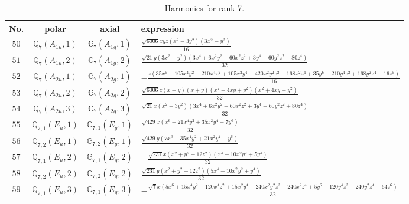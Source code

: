 \documentclass[fleqn,8pt,landscape]{jsarticle}
\begin{document}
\begin{table}[ht!]
\begin{center}
\caption{Harmonics for rank 7.}
\renewcommand{\arraystretch}{1.3}
\begin{tabular}{cccl} \hline \hline
No. & polar & axial & expression \\ \hline
$ 50 $ & $ \mathbb{Q}_{7}(A_{1u},1) $ & $ \mathbb{G}_{7}(A_{1g},1) $ & $ \frac{\sqrt{6006} x y z \left(x^{2} - 3 y^{2}\right) \left(3 x^{2} - y^{2}\right)}{16} $ \\
$ 51 $ & $ \mathbb{Q}_{7}(A_{1u},2) $ & $ \mathbb{G}_{7}(A_{1g},2) $ & $ \frac{\sqrt{21} y \left(3 x^{2} - y^{2}\right) \left(3 x^{4} + 6 x^{2} y^{2} - 60 x^{2} z^{2} + 3 y^{4} - 60 y^{2} z^{2} + 80 z^{4}\right)}{32} $ \\
$ 52 $ & $ \mathbb{Q}_{7}(A_{2u},1) $ & $ \mathbb{G}_{7}(A_{2g},1) $ & $ - \frac{z \left(35 x^{6} + 105 x^{4} y^{2} - 210 x^{4} z^{2} + 105 x^{2} y^{4} - 420 x^{2} y^{2} z^{2} + 168 x^{2} z^{4} + 35 y^{6} - 210 y^{4} z^{2} + 168 y^{2} z^{4} - 16 z^{6}\right)}{16} $ \\
$ 53 $ & $ \mathbb{Q}_{7}(A_{2u},2) $ & $ \mathbb{G}_{7}(A_{2g},2) $ & $ \frac{\sqrt{6006} z \left(x - y\right) \left(x + y\right) \left(x^{2} - 4 x y + y^{2}\right) \left(x^{2} + 4 x y + y^{2}\right)}{32} $ \\
$ 54 $ & $ \mathbb{Q}_{7}(A_{2u},3) $ & $ \mathbb{G}_{7}(A_{2g},3) $ & $ \frac{\sqrt{21} x \left(x^{2} - 3 y^{2}\right) \left(3 x^{4} + 6 x^{2} y^{2} - 60 x^{2} z^{2} + 3 y^{4} - 60 y^{2} z^{2} + 80 z^{4}\right)}{32} $ \\
$ 55 $ & $ \mathbb{Q}_{7,1}(E_{u},1) $ & $ \mathbb{G}_{7,1}(E_{g},1) $ & $ \frac{\sqrt{429} x \left(x^{6} - 21 x^{4} y^{2} + 35 x^{2} y^{4} - 7 y^{6}\right)}{32} $ \\
$ 56 $ & $ \mathbb{Q}_{7,2}(E_{u},1) $ & $ \mathbb{G}_{7,2}(E_{g},1) $ & $ \frac{\sqrt{429} y \left(7 x^{6} - 35 x^{4} y^{2} + 21 x^{2} y^{4} - y^{6}\right)}{32} $ \\
$ 57 $ & $ \mathbb{Q}_{7,1}(E_{u},2) $ & $ \mathbb{G}_{7,1}(E_{g},2) $ & $ - \frac{\sqrt{231} x \left(x^{2} + y^{2} - 12 z^{2}\right) \left(x^{4} - 10 x^{2} y^{2} + 5 y^{4}\right)}{32} $ \\
$ 58 $ & $ \mathbb{Q}_{7,2}(E_{u},2) $ & $ \mathbb{G}_{7,2}(E_{g},2) $ & $ \frac{\sqrt{231} y \left(x^{2} + y^{2} - 12 z^{2}\right) \left(5 x^{4} - 10 x^{2} y^{2} + y^{4}\right)}{32} $ \\
$ 59 $ & $ \mathbb{Q}_{7,1}(E_{u},3) $ & $ \mathbb{G}_{7,1}(E_{g},3) $ & $ - \frac{\sqrt{7} x \left(5 x^{6} + 15 x^{4} y^{2} - 120 x^{4} z^{2} + 15 x^{2} y^{4} - 240 x^{2} y^{2} z^{2} + 240 x^{2} z^{4} + 5 y^{6} - 120 y^{4} z^{2} + 240 y^{2} z^{4} - 64 z^{6}\right)}{32} $ \\

\end{tabular}
\end{center}
\end{table}
\end{document}
